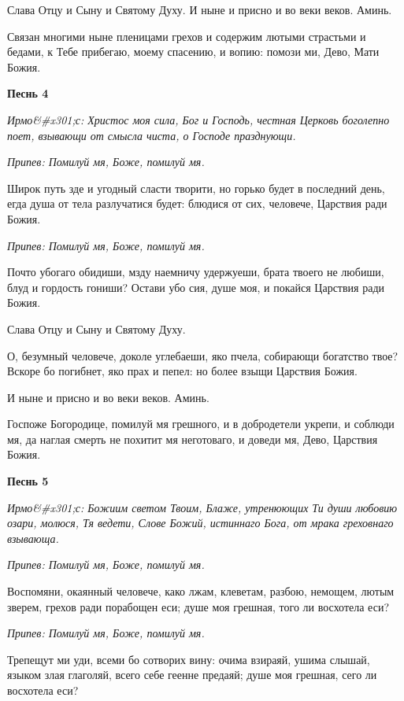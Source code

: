 Слава Отцу и Сыну и Святому Духу. И ныне и присно и во веки веков. Аминь.


Связан многими ныне пленицами грехов и содержим лютыми страстьми и бедами, к Тебе прибегаю, моему спасению, и вопию: помози ми, Дево, Мати Божия.




\bfseries Песнь 4\normalfont{}


\itshape Ирмо&#x301;с:\normalfont{} Христос моя сила, Бог и Господь, честная Церковь боголепно поет, взывающи от смысла чиста, о Господе празднующи.


\itshape Припев:\normalfont{} Помилуй мя, Боже, помилуй мя.


Широк путь зде и угодный сласти творити, но горько будет в последний день, егда душа от тела разлучатися будет: блюдися от сих, человече, Царствия ради Божия.


\itshape Припев:\normalfont{} Помилуй мя, Боже, помилуй мя.


Почто убогаго обидиши, мзду наемничу удержуеши, брата твоего не любиши, блуд и гордость гониши? Остави убо сия, душе моя, и покайся Царствия ради Божия.


Слава Отцу и Сыну и Святому Духу.


О, безумный человече, доколе углебаеши, яко пчела, собирающи богатство твое? Вскоре бо погибнет, яко прах и пепел: но более взыщи Царствия Божия.


И ныне и присно и во веки веков. Аминь.


Госпоже Богородице, помилуй мя грешного, и в добродетели укрепи, и соблюди мя, да наглая смерть не похитит мя неготоваго, и доведи мя, Дево, Царствия Божия.




\bfseries Песнь 5\normalfont{}


\itshape Ирмо&#x301;с:\normalfont{} Божиим светом Твоим, Блаже, утренюющих Ти души любовию озари, молюся, Тя ведети, Слове Божий, истиннаго Бога, от мрака греховнаго взывающа.


\itshape Припев:\normalfont{} Помилуй мя, Боже, помилуй мя.


Воспомяни, окаянный человече, како лжам, клеветам, разбою, немощем, лютым зверем, грехов ради порабощен еси; душе моя грешная, того ли восхотела еси?


\itshape Припев:\normalfont{} Помилуй мя, Боже, помилуй мя.


Трепещут ми уди, всеми бо сотворих вину: очима взираяй, ушима слышай, языком злая глаголяй, всего себе геенне предаяй; душе моя грешная, сего ли восхотела еси?


